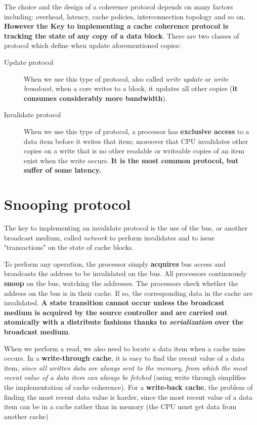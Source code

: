 \documentclass[10pt,a4paper]{article}
\begin{document}
The choice and the design of a coherence protocol depends on many factors including: overhead, latency, cache policies, interconnection topology and so on.
\textbf{However the Key to implementing a cache coherence protocol is tracking the state of any copy of a data block}. There are two classes of protocol which define when update aforementioned copies:
\begin{description}
\item[Update protocol] When we use this type of protocol, also called \textit{write update} or \textit{write broadcast}, when a core writes to a block, it updates all other copies (\textbf{it consumes considerably more bandwidth}).

\item[Invalidate protocol] When we use this type of protocol, a processor has \textbf{exclusive access} to a data item before it writes that item; moreover that CPU invalidates other copies on a write that is no other readable or writeable copies of an item exist when the write occurs. \textbf{It is the most common protocol, but suffer of some latency.}

\end{description}

\section{Snooping protocol}

The key to implementing an invalidate protocol is the use of the bus, or another broadcast medium, called \textit{network} to perform invalidates and to issue "transactions" on the state of cache blocks.

To perform any operation, the processor simply \textbf{acquires} bus access and broadcasts the address to be invalidated on the bus. All processors continuously \textbf{snoop} on the bus, watching the addresses. The processors check whether the address on the bus is in their cache. If so, the corresponding data in the cache are invalidated. \textbf{A state transition cannot occur unless the broadcast medium is acquired by the source controller and are carried out atomically with a distribute fashions thanks to \textit{serialization} over the broadcast medium}.

When we perform a read, we also need to locate a data item when a cache miss occurs. In a \textbf{write-through cache}, it is easy to find the recent value of a data item, \textit{since all written data are always sent to the memory, from which the most recent value of a data item can always be fetched} (using write through simplifies the implementation of cache coherence). For a \textbf{write-back cache}, the problem of finding the most recent data value is
harder, since the most recent value of a data item can be in a cache rather than in memory (the CPU must get data from another cache)
\end{document}

